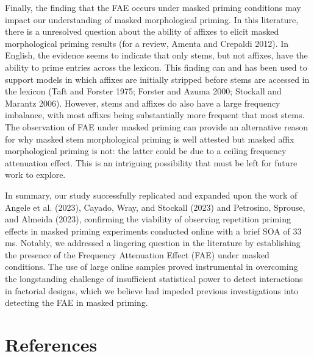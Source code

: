 \documentclass[
]{interact}
\begin{document}
Finally, the finding that the FAE occurs under masked priming conditions
may impact our understanding of masked morphological priming. In this
literature, there is a unresolved question about the ability of affixes
to elicit masked morphological priming results (for a review, Amenta and
Crepaldi 2012). In English, the evidence seems to indicate that only
stems, but not affixes, have the ability to prime entries across the
lexicon. This finding can and has been used to support models in which
affixes are initially stripped before stems are accessed in the lexicon
(Taft and Forster 1975; Forster and Azuma 2000; Stockall and Marantz
2006). However, stems and affixes do also have a large frequency
imbalance, with most affixes being substantially more frequent that most
stems. The observation of FAE under masked priming can provide an
alternative reason for why masked stem morphological priming is well
attested but masked affix morphological priming is not: the latter could
be due to a ceiling frequency attenuation effect. This is an intriguing
possibility that must be left for future work to explore.

In summary, our study successfully replicated and expanded upon the work
of Angele et al. (2023), Cayado, Wray, and Stockall (2023) and
Petrosino, Sprouse, and Almeida (2023), confirming the viability of
observing repetition priming effects in masked priming experiments
conducted online with a brief SOA of 33 ms. Notably, we addressed a
lingering question in the literature by establishing the presence of the
Frequency Attenuation Effect (FAE) under masked conditions. The use of
large online samples proved instrumental in overcoming the longstanding
challenge of insufficient statistical power to detect interactions in
factorial designs, which we believe had impeded previous investigations
into detecting the FAE in masked priming.

\newpage{}

\section*{References}\label{references}
\end{document}
